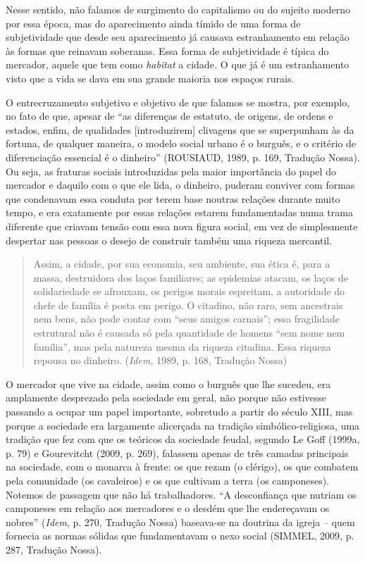 Nesse sentido, não falamos de surgimento do capitalismo ou do sujeito
moderno por essa época, mas do aparecimento ainda tímido de uma forma de
subjetividade que desde seu aparecimento já causava estranhamento em
relação às formas que reinavam soberanas. Essa forma de subjetividade é
típica do mercador, aquele que tem como \emph{habitat} a cidade\emph{.}
O que já é um estranhamento visto que a vida se dava em sua grande
maioria nos espaços rurais.

O entrecruzamento subjetivo e objetivo de que falamos se mostra, por
exemplo, no fato de que, apesar de ``as diferenças de estatuto, de
origens, de ordens e estados, enfim, de qualidades {[}introduzirem{]}
clivagens que se superpunham às da fortuna, de qualquer maneira, o
modelo social urbano é o burguês, e o critério de diferenciação
essencial é o dinheiro'' (ROUSIAUD, 1989, p. 169, Tradução Nossa). Ou
seja, as fraturas sociais introduzidas pela maior importância do papel
do mercador e daquilo com o que ele lida, o dinheiro, puderam conviver
com formas que condenavam essa conduta por terem base noutras relações
durante muito tempo, e era exatamente por essas relações estarem
fundamentadas numa trama diferente que criavam tensão com essa nova
figura social, em vez de simplesmente despertar nas pessoas o desejo de
construir também uma riqueza mercantil.

\begin{quote}
Assim, a cidade, por sua economia, seu ambiente, sua ética é, para a
massa, destruidora dos laços familiares; as epidemias atacam, os laços
de solidariedade se afrouxam, os perigos morais espreitam, a autoridade
do chefe de família é posta em perigo. O citadino, não raro, sem
ancestrais nem bens, não pode contar com ``seus amigos carnais''; essa
fragilidade estrutural não é causada só pela quantidade de homens ``sem
nome nem família'', mas pela natureza mesma da riqueza citadina. Essa
riqueza repousa no dinheiro. (\emph{Idem}, 1989, p. 168, Tradução Nossa)
\end{quote}

O mercador que vive na cidade, assim como o burguês que lhe sucedeu, era
amplamente desprezado pela sociedade em geral, não porque não estivesse
passando a ocupar um papel importante, sobretudo a partir do século
XIII, mas porque a sociedade era largamente alicerçada na tradição
simbólico-religiosa, uma tradição que fez com que os teóricos da
sociedade feudal, segundo Le Goff (1999a, p. 79) e Gourevitcht (2009, p.
269), falassem apenas de três camadas principais na sociedade, com o
monarca à frente: os que rezam (o clérigo), os que combatem pela
comunidade (os cavaleiros) e os que cultivam a terra (os camponeses).
Notemos de passagem que não há trabalhadores. ``A desconfiança que
nutriam os camponeses em relação aos mercadores e o desdém que lhe
endereçavam os nobres'' (\emph{Idem}, p. 270, Tradução Nossa) baseava-se
na doutrina da igreja -- quem fornecia as normas sólidas que
fundamentavam o nexo social (SIMMEL, 2009, p. 287, Tradução Nossa).

